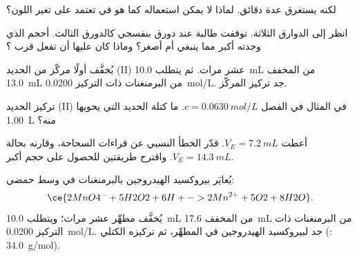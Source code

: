 \begin{exercise}[$\star\star$]\label{exo:g11:titration:8}
 لكنه يستغرق عدة دقائق. لماذا لا يمكن استعماله
كما هو في  تعتمد على تغير اللون؟
\end{exercise}

\begin{exercise}[$\star\star$]\label{exo:g11:titration:9}
انظر إلى الدوارق الثلاثة. توقفت طالبة عند دورق بنفسجي كالدورق
الثالث. أحجم  الذي وجدته أكبر مما ينبغي أم أصغر؟ وماذا كان
عليها أن تفعل قرب ؟
\end{exercise}

\begin{exercise}[$\star\star$]\label{exo:g11:titration:10}
يُخفَّف أولًا  مركّز من الحديد (II) عشر مرات. ثم يتطلب
\qty{10.0}{mL} من  المخفف \qty{13.0}{mL} من
البرمنغنات ذات التركيز \qty{0.0200}{mol/L}. جد تركيز
 المركّز.
\end{exercise}

\begin{exercise}[$\star\star$]\label{exo:g11:titration:11}
تركيز  الحديد (II) في المثال  في الفصل
$c = \qty{0.0630}{mol/L}$. ما كتلة الحديد التي يحويها \qty{1.00}{L}
منه؟
\end{exercise}

\begin{exercise}[$\star\star\star$]\label{exo:g11:titration:12}
أعطت  $V_E = \qty{7.2}{mL}$. قدّر الخطأ النسبي 
عن قراءات السحاحة، وقارنه بحالة $V_E = \qty{14.3}{mL}$. واقترح
طريقتين للحصول على حجم  أكبر.
\end{exercise}

\begin{exercise}[$\star\star\star$]\label{exo:g11:titration:13}
يُعايَر بيروكسيد الهيدروجين بالبرمنغنات في وسط حمضي:
\[
  \ce{2MnO4^- + 5H2O2 + 6H+ -> 2Mn^{2+} + 5O2 + 8H2O} .
\]
يُخفَّف مطهِّر عشر مرات؛ ويتطلب \qty{10.0}{mL} من 
المخفف \qty{17.6}{mL} من البرمنغنات ذات التركيز \qty{0.0200}{mol/L}.
جد  لبيروكسيد الهيدروجين في المطهِّر،
ثم تركيزه الكتلي (: \qty{34.0}{g/mol}).
\end{exercise}

